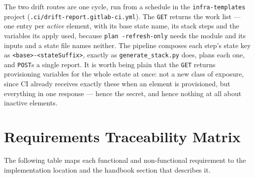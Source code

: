 \documentclass[12pt,a4paper,twoside]{report}
\newcommand{\code}[1]{\texttt{#1}}
\begin{document}
The two drift routes are one cycle, run from a schedule in the
\code{infra-templates} project (\code{.ci/drift-report.gitlab-ci.yml}). The
\code{GET} returns the work list --- one entry per \emph{active} element, with
its base state name, its stack steps and the variables its apply used, because
\code{plan -refresh-only} needs the module and its inputs and a state file names
neither. The pipeline composes each step's state key as
\code{<base>-<stateSuffix>}, exactly as \code{generate\_stack.py} does, plans
each one, and \code{POST}s a single report. It is worth being plain that the
\code{GET} returns provisioning variables for the whole estate at once: not a
new class of exposure, since CI already receives exactly these when an element is
provisioned, but everything in one response --- hence the secret, and hence
nothing at all about inactive elements.

\chapter{Requirements Traceability Matrix}
\label{app:rtm}

The following table maps each functional and non-functional requirement
to the implementation location and the handbook section that describes
it.
\end{document}

